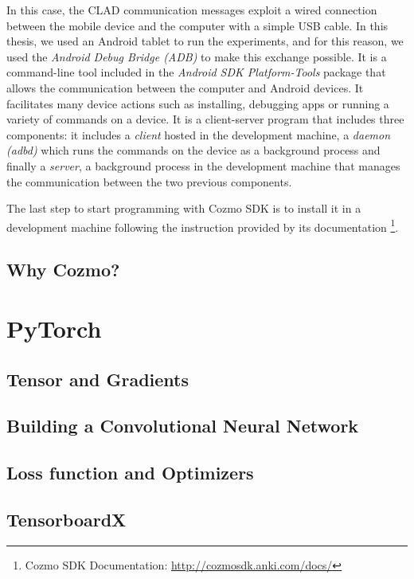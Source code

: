 In this case, the CLAD communication messages exploit a wired connection between the mobile device and the computer with a simple USB cable.  In this thesis, we used an Android tablet to run the experiments, and for this reason, we used the \textit{Android Debug Bridge (ADB)} to make this exchange possible.
It is a command-line tool included in the \textit{Android SDK Platform-Tools} package that allows the communication between the computer and Android devices. It facilitates many device actions such as installing, debugging apps or running a variety of commands on a device. It is a client-server program that includes three components: it includes a \textit{client} hosted in the development machine, a \textit{daemon (adbd)} which runs the commands on the device as a background process and finally a \textit{server}, a background process in the development machine that manages the communication between the two previous components.

The last step to start programming with Cozmo SDK is to install it in a development machine following the instruction provided by its documentation \footnote{Cozmo SDK Documentation: \href{http://cozmosdk.anki.com/docs/index.html}{http://cozmosdk.anki.com/docs/}}.


\subsection{Why Cozmo?}


\section{PyTorch}





\subsection{Tensor and Gradients}



\subsection{Building a Convolutional Neural Network}



\subsection{Loss function and Optimizers}



\subsection{TensorboardX}


